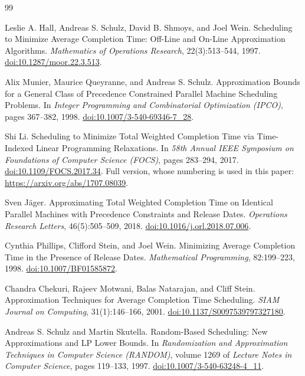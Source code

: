 \begin{thebibliography}{99}

Leslie A. Hall, Andreas S. Schulz, David B. Shmoys, and Joel Wein.
\newblock Scheduling to Minimize Average Completion Time: Off-Line and
On-Line Approximation Algorithms.
\newblock \emph{Mathematics of Operations Research}, 22(3):513--544, 1997.
\newblock \href{https://doi.org/10.1287/moor.22.3.513}
{doi:10.1287/moor.22.3.513}.

Alix Munier, Maurice Queyranne, and Andreas S. Schulz.
\newblock Approximation Bounds for a General Class of Precedence Constrained
Parallel Machine Scheduling Problems.
\newblock In \emph{Integer Programming and Combinatorial Optimization (IPCO)},
pages 367--382, 1998.
\newblock \href{https://doi.org/10.1007/3-540-69346-7_28}
{doi:10.1007/3-540-69346-7\_28}.

Shi Li.
\newblock Scheduling to Minimize Total Weighted Completion Time via
Time-Indexed Linear Programming Relaxations.
\newblock In \emph{58th Annual IEEE Symposium on Foundations of Computer
Science (FOCS)}, pages 283--294, 2017.
\newblock \href{https://doi.org/10.1109/FOCS.2017.34}
{doi:10.1109/FOCS.2017.34}.
\newblock Full version, whose numbering is used in this paper:
\url{https://arxiv.org/abs/1707.08039}.

Sven J\"ager.
\newblock Approximating Total Weighted Completion Time on Identical Parallel
Machines with Precedence Constraints and Release Dates.
\newblock \emph{Operations Research Letters}, 46(5):505--509, 2018.
\newblock \href{https://doi.org/10.1016/j.orl.2018.07.006}
{doi:10.1016/j.orl.2018.07.006}.

Cynthia Phillips, Clifford Stein, and Joel Wein.
\newblock Minimizing Average Completion Time in the Presence of Release Dates.
\newblock \emph{Mathematical Programming}, 82:199--223, 1998.
\newblock \href{https://doi.org/10.1007/BF01585872}
{doi:10.1007/BF01585872}.

Chandra Chekuri, Rajeev Motwani, Balas Natarajan, and Cliff Stein.
\newblock Approximation Techniques for Average Completion Time Scheduling.
\newblock \emph{SIAM Journal on Computing}, 31(1):146--166, 2001.
\newblock \href{https://doi.org/10.1137/S0097539797327180}
{doi:10.1137/S0097539797327180}.

Andreas S. Schulz and Martin Skutella.
\newblock Random-Based Scheduling: New Approximations and LP Lower Bounds.
\newblock In \emph{Randomization and Approximation Techniques in Computer
Science (RANDOM)}, volume 1269 of \emph{Lecture Notes in Computer Science},
pages 119--133, 1997.
\newblock \href{https://doi.org/10.1007/3-540-63248-4_11}
{doi:10.1007/3-540-63248-4\_11}.


\end{thebibliography}
